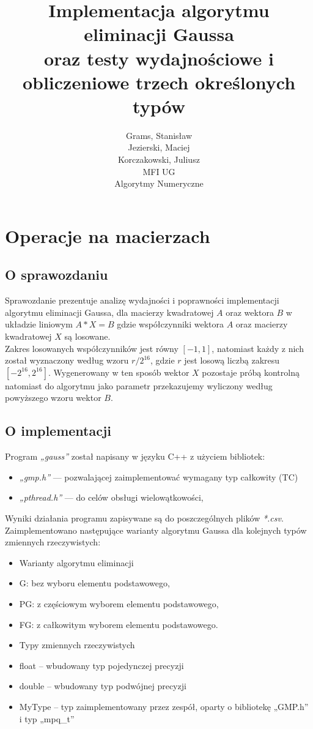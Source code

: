 \documentclass[12pt]{article}
\begin{document}
\title{Implementacja algorytmu eliminacji Gaussa\\oraz testy wydajnościowe i obliczeniowe trzech określonych typów}
\author{Grams, Stanisław\\Jezierski, Maciej\\Korczakowski, Juliusz\\ MFI UG\\Algorytmy Numeryczne}

\maketitle
\section {Operacje na macierzach}
\subsection{O sprawozdaniu}
Sprawozdanie prezentuje analizę wydajności i poprawności implementacji algorytmu eliminacji Gaussa, dla macierzy kwadratowej $A$ oraz wektora $B$ w układzie liniowym $A*X = B$ gdzie współczynniki wektora $A$ oraz macierzy kwadratowej $X$ są losowane. \\
Zakres losowanych współczynników jest równy $[-1, 1]$, natomiast każdy z nich został wyznaczony według wzoru $r/2^{16}$, gdzie $r$ jest losową liczbą zakresu $[-2^{16} , 2^{16}]$.
Wygenerowany w ten sposób wektor $X$ pozostaje próbą kontrolną natomiast do algorytmu jako parametr przekazujemy wyliczony według powyższego wzoru wektor $B$.
\subsection{O implementacji}
Program \textit{„gauss”} został napisany w języku C++ z użyciem bibliotek:
\begin{itemize}
    \item \textit{„gmp.h”} — pozwalającej zaimplementować wymagany typ całkowity (TC)
    \item \textit{„pthread.h”} — do celów obsługi wielowątkowości,
\end{itemize}
Wyniki działania programu zapisywane są do poszczególnych plików \textit{*.csv}.
Zaimplementowano następujące warianty algorytmu Gaussa dla kolejnych typów zmiennych rzeczywistych:
\begin{itemize}
\item[] Warianty algorytmu eliminacji
    \item G: bez wyboru elementu podstawowego,
    \item PG: z częściowym wyborem elementu podstawowego, 
    \item FG: z całkowitym wyborem elementu podstawowego.
\item[] Typy zmiennych rzeczywistych
    \item {float} – wbudowany typ pojedynczej precyzji 
    \item {double} – wbudowany typ podwójnej precyzji
    \item {MyType} – typ zaimplementowany przez zespół, oparty o bibliotekę „GMP.h” i typ „mpq\_t”
\end{itemize}
\end{document}
